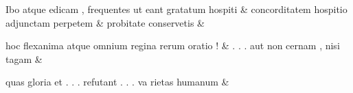 \documentclass[12pt,onecolumn,twoside,a4paper]{memoir}
\begin{document}
\begin{pairs}
\begin{Leftside}
                              Ibo
                              atque
                              edicam
                              ,
                              frequentes
                              ut
                              eant
                              gratatum
                              hospiti \&
                         \stanza {}concorditatem
                              hospitio
                              adjunctam
                              perpetem & 
                     probitate
                              conservetis \&
                         \stanza {}
                     
                              hoc
                              flexanima
                              atque
                              omnium
                              regina
                              rerum
                              oratio
                              ! \&
                         \stanza {}
                     .
                              .
                              .
                              aut
                              non
                              cernam
                              ,
                              nisi
                              tagam \&
                         \stanza {}
                     
                              quas
                              gloria
                              et
                              {
                              .
                              .
                              .
                              refutant
                              .
                              .
                              .
                              va
                              }
                              rietas
                              humanum \&
                     
                  \endnumbering
		\end{Leftside}
                  \begin{Rightside}
			\beginnumbering
			\numberstanzafalse
                     

\end{Rightside}
\end{pairs}
\end{document}

